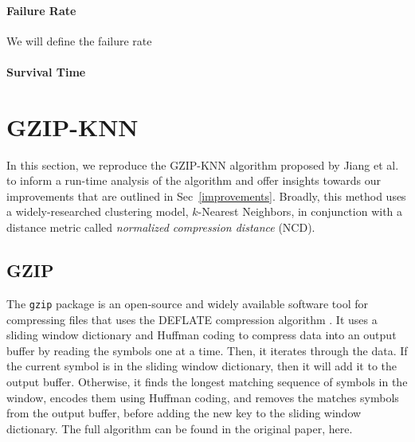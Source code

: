 \documentclass[sigconf]{acmart}
\begin{document}
\paragraph{Failure Rate}
We will define the failure rate
\paragraph{Survival Time}

\section{GZIP-KNN}
In this section, we reproduce the GZIP-KNN algorithm proposed by Jiang et al. to inform a run-time analysis of the algorithm and offer insights towards our  improvements that are outlined in Sec~\ref{improvements}. Broadly, this method uses a widely-researched clustering model, $k$-Nearest Neighbors, in conjunction with a  distance metric called \textit{normalized compression distance} (NCD). 


\subsection{GZIP}
    The \texttt{gzip} package is an open-source and widely available software tool for compressing files \cite{gzip} that uses the DEFLATE compression algorithm \cite{deflate}. It uses a sliding window dictionary and Huffman coding \cite{} to compress data into an output buffer by reading the symbols one at a time. Then, it iterates through the data. If the current symbol is in the sliding window dictionary, then it will add it to the output buffer. Otherwise, it finds the longest matching sequence of symbols in the window, encodes them using Huffman coding, and removes the matches symbols from the output buffer, before adding the new key to the sliding window dictionary. The full algorithm can be found in the original paper, here\cite{deflate}.
  
  
    
    
\end{document}
